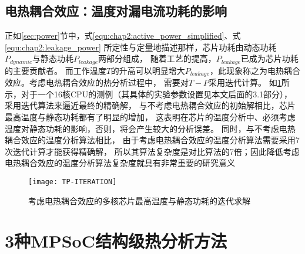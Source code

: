 \subsection{电热耦合效应：温度对漏电流功耗的影响}
正如\ref{sec:power}节中，式\ref{equ:chap2:active_power_simplified}、式\ref{equ:chap2:leakage_power} 所定性与定量地描述那样，芯片功耗由动态功耗$P_{dynamic}$与静态功耗$P_{leakage}$两部分组成， 随着工艺的提高，$P_{leakage}$已成为芯片功耗的主要贡献者。 而工作温度$T$的升高可以明显增大$P_{leakage}$，此现象称之为电热耦合效应。考虑电热耦合效应的热分析过程中， 需要对$T-P$采用迭代计算。
如\ref{fig:tp-iteration}所示，对于一个16核CPU的测例（其具体的实验参数设置见本文后面的3.1部分）， 采用迭代算法来逼近最终的精确解， 与不考虑电热耦合效应的初始解相比，芯片最高温度与静态功耗都有了明显的增加， 这表明在芯片的温度分析中、必须考虑温度对静态功耗的影响，否则，将会产生较大的分析误差。 同时，与不考虑电热耦合效应的温度分析算法相比， 由于考虑电热耦合效应的温度分析算法需要采用7次迭代计算才能获得精确解， 所以其算法复杂度是对比算法的7倍；因此降低考虑电热耦合效应的温度分析算法复杂度就具有非常重要的研究意义
\begin{figure}[H]
  \centering
  \texttt{[image: TP-ITERATION]}
  \caption{考虑电热耦合效应的多核芯片最高温度与静态功耗的迭代求解}
  \label{fig:tp-iteration}
\end{figure}


\section{3种MPSoC结构级热分析方法}
\label{sec:SSTAmethod}

